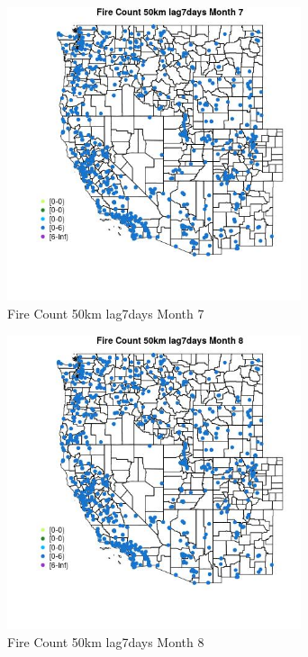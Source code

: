 \begin{figure} 
\centering  
\includegraphics[width=0.77\textwidth]{Code_Outputs/Report_ML_input_PM25_Step4_part_e_de_duplicated_aves_compiled_2019-05-21wNAs_MapObsMo7Fire_Count_50km_lag7days.jpg} 
\caption{\label{fig:Report_ML_input_PM25_Step4_part_e_de_duplicated_aves_compiled_2019-05-21wNAsMapObsMo7Fire_Count_50km_lag7days}Fire Count 50km lag7days Month 7} 
\end{figure} 
 

\begin{figure} 
\centering  
\includegraphics[width=0.77\textwidth]{Code_Outputs/Report_ML_input_PM25_Step4_part_e_de_duplicated_aves_compiled_2019-05-21wNAs_MapObsMo8Fire_Count_50km_lag7days.jpg} 
\caption{\label{fig:Report_ML_input_PM25_Step4_part_e_de_duplicated_aves_compiled_2019-05-21wNAsMapObsMo8Fire_Count_50km_lag7days}Fire Count 50km lag7days Month 8} 
\end{figure} 
 


